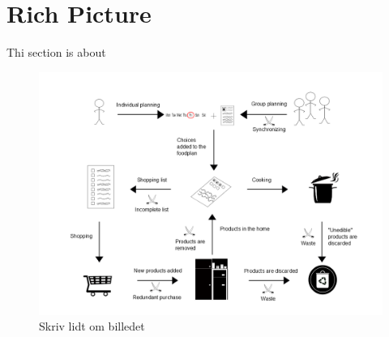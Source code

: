 \section{Rich Picture}
Thi section is about 


\begin{figure}[H]
	\centering
	\includegraphics[width=1.00\textwidth]{Grafik/FoodPlanner/InkscapeTegninger/RigtBillede.png}
	\caption{Skriv lidt om billedet}
\end{figure}
